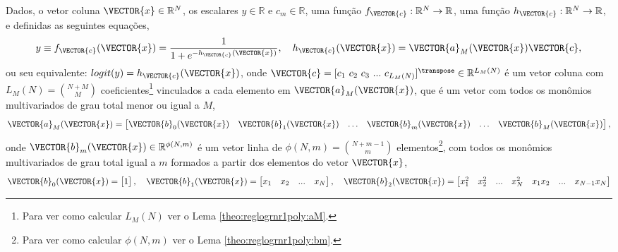 
\begin{myproofT}\label{proof:theo:reglogrnr1poly}
Dados,
o vetor coluna $\VECTOR{x} \in \mathbb{R}^{N}$, os escalares $y \in \mathbb{R}$ e $c_m \in \mathbb{R}$,
uma função $f_{\VECTOR{c}}:\mathbb{R}^{N} \rightarrow \mathbb{R}$, 
uma função $h_{\VECTOR{c}}:\mathbb{R}^{N} \rightarrow \mathbb{R}$,  e 
definidas as seguintes equações,
\begin{equation}\label{eq:proof:theo:reglogrnr1poly:1}
y\equiv f_{\VECTOR{c}}(\VECTOR{x})= \frac{1}{1+e^{-h_{\VECTOR{c}}(\VECTOR{x}) }},
\quad h_{\VECTOR{c}}(\VECTOR{x}) =  \VECTOR{a}_M(\VECTOR{x})\VECTOR{c},
\end{equation}
ou seu equivalente: $logit(y)=h_{\VECTOR{c}}(\VECTOR{x})$,
onde $\VECTOR{c}=[c_1~ c_2~ c_3~  ...~ c_{L_M(N)}]^{\transpose} \in \mathbb{R}^{L_M(N)}$ é um vetor coluna
com $L_M(N)=\binom{N+M}{M}$ coeficientes\footnote{Para ver como calcular $L_M(N)$ ver o Lema \ref{theo:reglogrnr1poly:aM}.} 
vinculados a cada elemento em
$\VECTOR{a}_M(\VECTOR{x})$, que  é um vetor com todos os monômios multivariados de grau total menor ou igual a $M$,
\begin{equation}\label{eq:proof:theo:reglogrnr1poly:2}
\VECTOR{a}_M(\VECTOR{x})=
\begin{bmatrix}
\VECTOR{b}_0(\VECTOR{x}) &
\VECTOR{b}_1(\VECTOR{x}) &
\hdots &
\VECTOR{b}_m(\VECTOR{x}) &
\hdots &
\VECTOR{b}_M(\VECTOR{x}) 
\end{bmatrix},
\end{equation}
onde $\VECTOR{b}_m(\VECTOR{x}) \in \mathbb{R}^{\phi(N,m)}$ é um vetor linha 
de $\phi(N,m)=\binom{N+m-1}{m}$ elementos\footnote{Para ver como calcular $\phi(N,m)$ ver o Lema \ref{theo:reglogrnr1poly:bm}.},
com todos os monômios multivariados de grau total igual a $m$
formados a partir dos elementos do vetor $\VECTOR{x}$,
\begin{equation}\label{eq:proof:theo:reglogrnr1poly:3}
\VECTOR{b}_0(\VECTOR{x})=
\begin{bmatrix}
1 
\end{bmatrix},
\quad 
\VECTOR{b}_1(\VECTOR{x})=
\begin{bmatrix}
x_1 & x_2 & ... &  x_N
\end{bmatrix},
\quad 
\VECTOR{b}_2(\VECTOR{x})=
\begin{bmatrix}
x_1^2 & x_2^2 & ... &  x_N^2 & x_1 x_2 &  ... & x_{N-1} x_N

\end{bmatrix}
\end{equation}
\end{myproofT}
